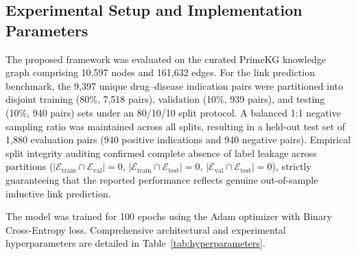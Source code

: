 \documentclass[preprint,12pt]{elsarticle}
\begin{document}
\subsection{Experimental Setup and Implementation Parameters}
The proposed framework was evaluated on the curated PrimeKG knowledge graph comprising 10,597 nodes and 161,632 edges. For the link prediction benchmark, the 9,397 unique drug--disease indication pairs were partitioned into disjoint training (80\%, 7,518 pairs), validation (10\%, 939 pairs), and testing (10\%, 940 pairs) sets under an 80/10/10 split protocol. A balanced 1:1 negative sampling ratio was maintained across all splits, resulting in a held-out test set of 1,880 evaluation pairs (940 positive indications and 940 negative pairs). Empirical split integrity auditing confirmed complete absence of label leakage across partitions ($|\mathcal{E}_{\mathrm{train}} \cap \mathcal{E}_{\mathrm{val}}| = 0$, $|\mathcal{E}_{\mathrm{train}} \cap \mathcal{E}_{\mathrm{test}}| = 0$, $|\mathcal{E}_{\mathrm{val}} \cap \mathcal{E}_{\mathrm{test}}| = 0$), strictly guaranteeing that the reported performance reflects genuine out-of-sample inductive link prediction.

The model was trained for 100 epochs using the Adam optimizer with Binary Cross-Entropy loss. Comprehensive architectural and experimental hyperparameters are detailed in Table~\ref{tab:hyperparameters}.
\end{document}
